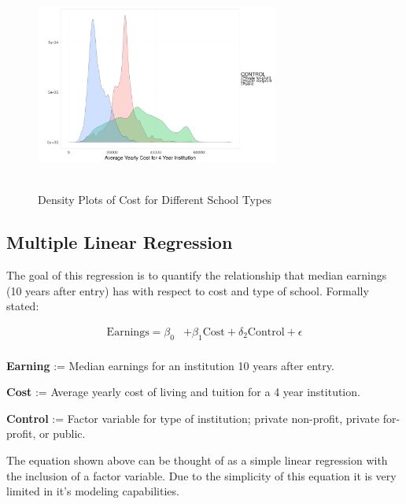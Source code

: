 \documentclass[%
 reprint,
 amsmath,amssymb,
 aps,
]{revtex4-1}
\begin{document}
\begin{figure}[h]
\caption{Density Plots of Cost for Different School Types}
\includegraphics[width=8cm, height=7cm]{cost.png}
\end{figure}

\subsection{\label{sec:level2} Multiple Linear Regression}
The goal of this regression is to quantify the relationship that median earnings (10 years after entry) has with respect to cost and type of school. Formally stated: 

\begin{align*}
	\mathrm{Earnings} = \beta_{0} 
    &+ \beta_{1}  \mathrm{Cost} + \delta_{2}  \mathrm{Control} + \epsilon\\
\end{align*}

\textbf{Earning} := Median earnings for an institution 10 years after entry.

\textbf{Cost} := Average yearly cost of living and tuition for a 4 year institution.

\textbf{Control} := Factor variable for type of institution; private non-profit, private for-profit, or public.

\vspace{2mm}

The equation shown above can be thought of as a simple linear regression with the inclusion of a factor variable.  Due to the simplicity of this equation it is very limited in it's modeling capabilities. 
\end{document}
